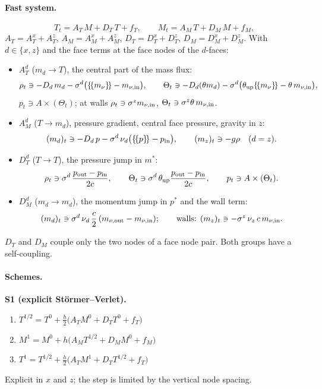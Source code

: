 \documentclass[11pt,a4paper]{article}
\newcommand{\avg}[1]{\{\!\{#1\}\!\}}
\begin{document}
\paragraph{Fast system.}
\begin{equation}
T_t=A_T\,M+D_T\,T+f_T,\qquad M_t=A_M\,T+D_M\,M+f_M,\label{eq:std}
\end{equation}
$A_T=A_T^x+A_T^z$, $A_M=A_M^x+A_M^z$, $D_T=D_T^x+D_T^z$, $D_M=D_M^x+D_M^z$. With $d\in\{x,z\}$ and the face terms at the face nodes of the
$d$-faces:
\begin{itemize}
\item $A_T^d$ ($m_d\to T$), the central part of the mass flux:
  \[
  \rho_t\ni-D_d\,m_d-\sigma^d\big(\avg{m_\nu}-m_{\nu,\rm in}\big),\qquad \Theta_t\ni-D_d(\theta m_d)-\sigma^d\big(\theta_{\rm up}\avg{m_\nu}-\theta\,m_{\nu,\rm in}\big),
  \]
  $p_t\ni A\times(\Theta_t)$; at walls $\rho_t\ni\sigma^z m_{\nu,\rm in}$, $\Theta_t\ni\sigma^z\theta\,m_{\nu,\rm in}$.
\item $A_M^d$ ($T\to m_d$), pressure gradient, central face pressure, gravity in $z$:
  \[
  (m_d)_t\ni-D_d\,p-\sigma^d\,\nu_d\big(\avg p-p_{\rm in}\big),\qquad (m_z)_t\ni-g\rho\quad(d=z).
  \]
\item $D_T^d$ ($T\to T$), the pressure jump in $m^*$:
  \[
  \rho_t\ni\sigma^d\,\frac{p_{\rm out}-p_{\rm in}}{2c},\qquad \Theta_t\ni\sigma^d\,\theta_{\rm up}\frac{p_{\rm out}-p_{\rm in}}{2c},\qquad p_t\ni A\times(\Theta_t).
  \]
\item $D_M^d$ ($m_d\to m_d$), the momentum jump in $p^*$ and the wall term:
  \[
  (m_d)_t\ni\sigma^d\,\nu_d\,\frac c2\,(m_{\nu,\rm out}-m_{\nu,\rm in});\qquad\text{walls: }(m_z)_t\ni-\sigma^z\,\nu_z\,c\,m_{\nu,\rm in}.
  \]
\end{itemize}
$D_T$ and $D_M$ couple only the two nodes of a face node pair. Both groups have a self-coupling.

\paragraph{Schemes.}

\medskip\noindent\textbf{S1 (explicit Störmer--Verlet).}
\begin{enumerate}
\item $T^{1/2}=T^0+\tfrac h2\big(A_TM^0+D_TT^0+f_T\big)$
\item $M^1=M^0+h\big(A_MT^{1/2}+D_MM^0+f_M\big)$
\item $T^1=T^{1/2}+\tfrac h2\big(A_TM^1+D_TT^{1/2}+f_T\big)$
\end{enumerate}
Explicit in $x$ and $z$; the step is limited by the vertical node spacing.
\end{document}
